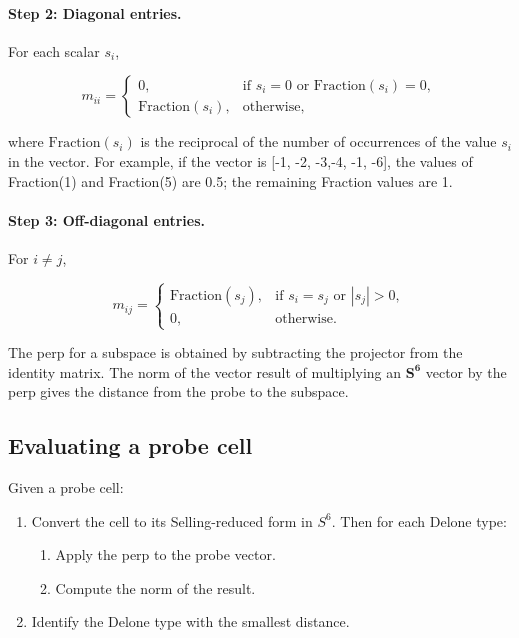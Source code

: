 \documentclass[preprint]{iucr}              %
\newcommand{\SVI}[0]{$\mathbf{S^{6}}$}
\begin{document}
	\paragraph{Step 2: Diagonal entries.}
	For each scalar $s_i$,
	
	
	\[
	m_{ii} =
	\begin{cases}
		0, & \text{if } s_i = 0 \text{ or } \mathrm{Fraction}(s_i) = 0, \\
		\mathrm{Fraction}(s_i), & \text{otherwise},
	\end{cases}
	\]
	
	
	where $\mathrm{Fraction}(s_i)$ is the reciprocal of the number of occurrences
	of the value $s_i$ in the vector. For example, if the vector is 
	[-1, -2, -3,-4, -1, -6], the values of Fraction(1) and Fraction(5)
	are 0.5; the remaining Fraction values are 1.
	
	\paragraph{Step 3: Off-diagonal entries.}
	For $i \neq j$,	
	
	\[
	m_{ij} =
	\begin{cases}
		\mathrm{Fraction}(s_j), & \text{if } s_i = s_j \text{ or } |s_j| > 0, \\
		0, & \text{otherwise}.
	\end{cases}
	\]
	
	
	
	The perp for a subspace is obtained by subtracting the projector from the
	identity matrix. The norm of the vector result of multiplying
	an \SVI{} vector by the perp gives the
	distance from the probe to the subspace.
	
	\subsection{Evaluating a probe cell}
	
	Given a probe cell:
	
	\begin{enumerate}
		\item Convert the cell to its Selling-reduced form in $S^6$. Then 
		for each Delone type:
		\begin{enumerate}
			\item 		Apply the perp to the probe vector.
			\item 		Compute the norm of the result.
		\end{enumerate}
		\item 	 Identify the Delone type with the smallest distance.
		
	\end{enumerate}	
	
\end{document}
